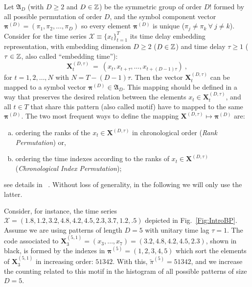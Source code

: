 \documentclass[sts]{imsart}
\begin{document}
Let ${\mathfrak A}_{D}$ (with $D \geq 2$ and $D \in {\Bbb Z}$) be the symmetric group of order $D!$ formed by all 
possible permutation of order $D$, and the symbol component vector 
${\bm \pi}^{(D)} = (\pi_1, \pi_2, \dots, \pi_D)$ so every element ${\bm \pi}^{(D)}$ is unique 
($\pi_j \neq \pi_k~\forall~j \neq k$). 
Consider for the time series ${\mathcal X} \equiv \{x_t\}_{t=1}^{T}$ its time delay embedding representation,
with embedding dimension $D \geq 2$ ($D \in {\Bbb Z}$) and time delay $\tau \geq 1$ ($\tau \in {\Bbb Z}$, also called ``embedding time''):
\begin{equation} 
\label{eq:time-delay}
{\mathbf X}^{(D,\tau)}_t ~=~( x_t,x_{t+\tau},\dots,x_{t+(D-1)\tau} ) \ ,
\end{equation} 
for $t = 1,2,\dots,N$ with $N = T-(D-1) \tau$.
Then the vector ${\mathbf X}^{(D,\tau)}_t$ can be mapped to a symbol vector ${\bm \pi}^{(D)} \in {\mathfrak A}_{D}$. 
This mapping should be defined in a way that preserves the desired relation between the elements 
$x_t  \in {\mathbf X}^{(D,\tau)}_t$, and all $t \in T$ that share this pattern (also called motif) have to mapped to the same 
${\bm \pi}^{(D)}$. 
The two most frequent ways to define the mapping ${\mathbf X}^{(D,\tau)} \mapsto {\bm \pi}^{(D)}$ are:  
\begin{enumerate}[a)]
\item ordering the ranks of the $x_t \in {\mathbf X}^{(D,\tau)}$ in chronological order 
       (\textit{Rank Permutation}) or,
\item ordering the time indexes according to the ranks of $x_t \in {\mathbf X}^{(D,\tau)}$  
       (\textit{Chronological Index Permutation});
\end{enumerate}
       see details in \citeauthor{BPRepeatedValuesChaos}~.
Without loss of generality, in the following we will only use the latter.



Consider, for instance, the time series $\mathcal X = (1.8, 1.2, 3.2, 4.8, 4.2, 4.5, 2.3, 3.7, 1.2, .5)$ depicted in Fig.~\ref{Fig:IntroBP}.
Assume we are using patterns of length $D=5$ with unitary time lag $\tau=1$.
The code associated to $\mathbf X_{3}^{(5,1)}=(x_3,\dots,x_7)=(3.2, 4.8, 4.2, 4.5, 2.3)$, shown in black, is formed by the indexes in $\bm\pi^{(5)}=(1,2,3,4,5)$ which sort the elements of $\mathbf X_{3}^{(5,1)}$ in increasing order: $51342$.
With this, $\widetilde{\pi}^{(5)} = 51342$, and we increase the counting related to this motif in the histogram of all possible patterns of size $D=5$.
\end{document}
